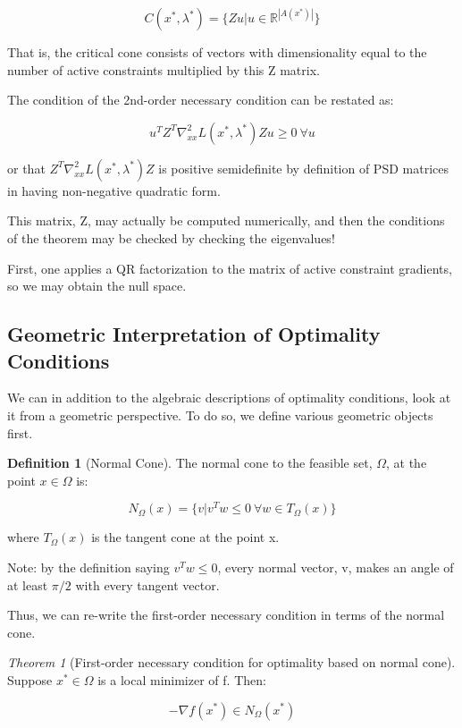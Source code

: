 \documentclass[class=article, crop=false]{standalone}
\theoremstyle{definition}
\newtheorem{definition}{Definition}[section]
\theoremstyle{remark}
\theoremstyle{lemma}
\theoremstyle{theorem}
\newtheorem*{theorem}{Theorem}
\theoremstyle{corollary}
\theoremstyle{property}
\begin{document}
				$$C(x^*, \lambda^*) = \{ Zu | u \in \mathbb{R}^{|A(x^*)|}\}$$

			That is, the critical cone consists of vectors with dimensionality equal to the number of active constraints multiplied by this Z matrix. 

			The condition of the 2nd-order necessary condition can be restated as:

				$$u^T Z^T \nabla_{xx}^2 L(x^*, \lambda^*) Zu \ge 0 \ \forall u$$

			or that $Z^T \nabla_{xx}^2 L(x^*, \lambda^*) Z$ is positive semidefinite by definition of PSD matrices in having non-negative quadratic form. 

			This matrix, Z, may actually be computed numerically, and then the conditions of the theorem may be checked by checking the eigenvalues!

			First, one applies a QR factorization to the matrix of active constraint gradients, so we may obtain the null space.

	\subsection{Geometric Interpretation of Optimality Conditions}
		We can in addition to the algebraic descriptions of optimality conditions, look at it from a geometric perspective. To do so, we define various geometric objects first.

		\begin{definition} [Normal Cone]
			The normal cone to the feasible set, $\Omega$, at the point $x \in \Omega$ is:

				$$N_\Omega(x) = \{v | v^Tw \le 0 \ \forall w \in T_\Omega(x) \}$$

			where $T_\Omega(x)$ is the tangent cone at the point x. 

			Note: by the definition saying $v^Tw \le 0$, every normal vector, v, makes an angle of at least $\pi/2$ with every tangent vector.
		\end{definition}

		Thus, we can re-write the first-order necessary condition in terms of the normal cone.

		\begin{theorem} [First-order necessary condition for optimality based on normal cone]

			Suppose $x^* \in \Omega$ is a local minimizer of f. Then:

				$$- \nabla f(x^*) \in N_\Omega(x^*)$$
		\end{theorem}
\end{document}
